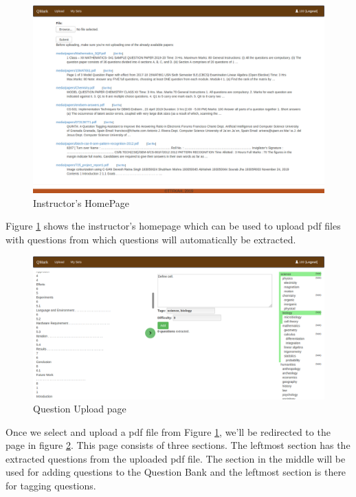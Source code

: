 \documentclass[13pt]{article}
\begin{document}
\begin{figure}[H]
    \includegraphics[width=\textwidth,height=\textheight,keepaspectratio]{5.png}
    \caption{Instructor's HomePage}
    \label{fig:inst_home}
\end{figure}
Figure \ref{fig:inst_home} shows the instructor's homepage which can be used to upload pdf files with questions from which questions will automatically be extracted.

\begin{figure}[H]
    \includegraphics[width=\textwidth,height=\textheight,keepaspectratio]{6.png}
    \caption{Question Upload page}
    \label{fig:inst_upload}
\end{figure}
Once we select and upload a pdf file from Figure \ref{fig:inst_home}, we'll be redirected to the page in figure \ref{fig:inst_upload}. This page consists of three sections. The leftmost section has the extracted questions from the uploaded pdf file. The section in the middle will be used for adding questions to the Question Bank and the leftmost section is there for tagging questions.
\end{document}
